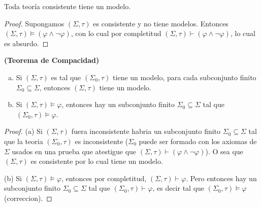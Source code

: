 
  \begin{corollary}
    \PN Toda teoría consistente tiene un modelo.
  \end{corollary}
  \begin{proof}
    Supongamos $(\Sigma, \tau)$ es consistente y no tiene modelos. Entonces $ (\Sigma, \tau)\models \left( \varphi
    \wedge \lnot \varphi \right) $, con lo cual por completitud $(\Sigma, \tau)\vdash \left( \varphi \wedge \lnot
    \varphi \right) $, lo cual es absurdo.
  \end{proof}

  \begin{corollary}
    \PN \textbf{(Teorema de Compacidad)}
    \begin{enumerate}[(a)]
      \item Si $(\Sigma, \tau)$ es tal que $(\Sigma_{0}, \tau)$ tiene un modelo, para cada subconjunto finito
      $\Sigma_{0} \subseteq \Sigma$, entonces $(\Sigma, \tau)$ tiene un modelo.
      \item Si $(\Sigma, \tau) \models \varphi$, entonces hay un subconjunto finito $\Sigma_{0} \subseteq \Sigma$ tal
      que $(\Sigma_{0}, \tau) \models \varphi$.
    \end{enumerate}
  \end{corollary}
  \begin{proof}
    (a) Si $(\Sigma, \tau)$ fuera inconsistente habria un subconjunto finito $ \Sigma _{0}\subseteq \Sigma $ tal que la teoria $(\Sigma _{0},\tau )$ es inconsistente ($\Sigma _{0}$ puede ser formado con los axiomas de $\Sigma $ usados en una prueba que atestigue que $(\Sigma, \tau)\vdash \left( \varphi \wedge \lnot \varphi \right) $). O sea que $(\Sigma, \tau)$ es consistente por lo cual tiene un modelo.

    (b) Si $(\Sigma, \tau)\models \varphi $, entonces por completitud, $(\Sigma, \tau)\vdash \varphi $. Pero entonces hay un subconjunto finito $\Sigma _{0}\subseteq \Sigma $ tal que $(\Sigma _{0},\tau )\vdash \varphi $, es decir tal que $(\Sigma _{0},\tau )\models \varphi $ (correccion).
  \end{proof}

